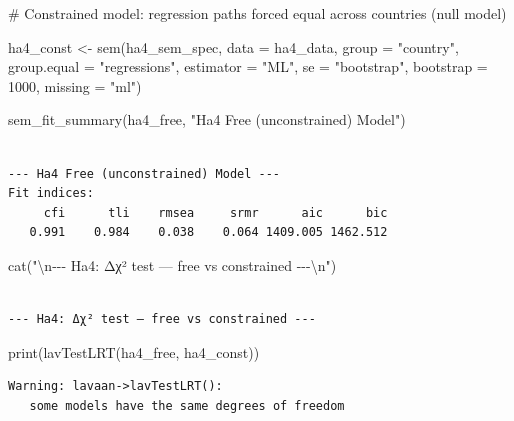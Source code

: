 \documentclass[
  letterpaper,
  DIV=11,
  numbers=noendperiod]{scrartcl}
\newenvironment{Shaded}{\begin{snugshade}}{\end{snugshade}}
\newcommand{\AttributeTok}[1]{\textcolor[rgb]{0.40,0.45,0.13}{#1}}
\newcommand{\CommentTok}[1]{\textcolor[rgb]{0.37,0.37,0.37}{#1}}
\newcommand{\DecValTok}[1]{\textcolor[rgb]{0.68,0.00,0.00}{#1}}
\newcommand{\FunctionTok}[1]{\textcolor[rgb]{0.28,0.35,0.67}{#1}}
\newcommand{\NormalTok}[1]{\textcolor[rgb]{0.00,0.23,0.31}{#1}}
\newcommand{\OtherTok}[1]{\textcolor[rgb]{0.00,0.23,0.31}{#1}}
\newcommand{\SpecialCharTok}[1]{\textcolor[rgb]{0.37,0.37,0.37}{#1}}
\newcommand{\StringTok}[1]{\textcolor[rgb]{0.13,0.47,0.30}{#1}}
\begin{document}
\begin{Shaded}
\begin{Highlighting}[]
\CommentTok{\# Constrained model: regression paths forced equal across countries (null model)}

\NormalTok{ha4\_const }\OtherTok{\textless{}{-}} \FunctionTok{sem}\NormalTok{(ha4\_sem\_spec, }\AttributeTok{data =}\NormalTok{ ha4\_data, }\AttributeTok{group =} \StringTok{"country"}\NormalTok{,}
                 \AttributeTok{group.equal =} \StringTok{"regressions"}\NormalTok{,}
                 \AttributeTok{estimator =} \StringTok{"ML"}\NormalTok{, }\AttributeTok{se =} \StringTok{"bootstrap"}\NormalTok{, }\AttributeTok{bootstrap =} \DecValTok{1000}\NormalTok{,}
                 \AttributeTok{missing =} \StringTok{"ml"}\NormalTok{)}

\FunctionTok{sem\_fit\_summary}\NormalTok{(ha4\_free, }\StringTok{"Ha4 Free (unconstrained) Model"}\NormalTok{)}
\end{Highlighting}
\end{Shaded}

\begin{verbatim}

--- Ha4 Free (unconstrained) Model ---
Fit indices:
     cfi      tli    rmsea     srmr      aic      bic 
   0.991    0.984    0.038    0.064 1409.005 1462.512 
\end{verbatim}

\begin{Shaded}
\begin{Highlighting}[]
\FunctionTok{cat}\NormalTok{(}\StringTok{"}\SpecialCharTok{\textbackslash{}n}\StringTok{{-}{-}{-} Ha4: Δχ² test — free vs constrained {-}{-}{-}}\SpecialCharTok{\textbackslash{}n}\StringTok{"}\NormalTok{)}
\end{Highlighting}
\end{Shaded}

\begin{verbatim}

--- Ha4: Δχ² test — free vs constrained ---
\end{verbatim}

\begin{Shaded}
\begin{Highlighting}[]
\FunctionTok{print}\NormalTok{(}\FunctionTok{lavTestLRT}\NormalTok{(ha4\_free, ha4\_const))}
\end{Highlighting}
\end{Shaded}

\begin{verbatim}
Warning: lavaan->lavTestLRT():  
   some models have the same degrees of freedom
\end{verbatim}
\end{document}

